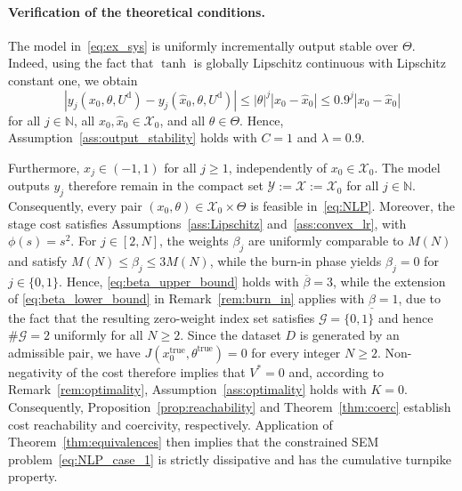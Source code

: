 \documentclass[a4paper,fleqn]{cas-dc}
\begin{document}
\paragraph{Verification of the theoretical conditions.}
The model in~\eqref{eq:ex_sys} is uniformly incrementally output stable over $\Theta$. Indeed, using the fact that $\tanh$ is globally Lipschitz continuous with Lipschitz constant one, we obtain
\begin{equation*}
	|y_j(x_0,\theta,U^{\mathrm d}) - y_j(\hat{x}_0,\theta,U^{\mathrm d})|
	\leq |\theta|^j|x_0-\hat{x}_0| \leq 0.9^j|x_0-\hat{x}_0|
\end{equation*}
for all $j\in\mathbb{N}$, all $x_0,\hat{x}_0\in\mathcal{X}_0$, and all $\theta\in\Theta$.
Hence, Assumption~\ref{ass:output_stability} holds with $C=1$ and $\lambda=0.9$.

Furthermore, $x_j\in(-1,1)$ for all $j\geq1$, independently of $x_0\in\mathcal{X}_0$.
The model outputs $y_j$ therefore remain in the compact set $\mathcal{Y}:=\mathcal{X}:=\mathcal{X}_0$ for all $j\in\mathbb{N}$. Consequently, every pair $(x_0,\theta)\in\mathcal{X}_0\times\Theta$ is feasible in~\eqref{eq:NLP}. Moreover, the stage cost satisfies Assumptions~\ref{ass:Lipschitz} and~\ref{ass:convex_lr}, with $\phi(s)=s^2$.
For $j\in[2,N]$, the weights $\beta_j$ are uniformly comparable to $M(N)$ and satisfy $M(N)\leq\beta_j\leq3M(N)$, while the burn-in phase yields $\beta_j=0$ for $j\in\{0,1\}$. Hence, \eqref{eq:beta_upper_bound} holds with $\overline{\beta}=3$, while the extension of \eqref{eq:beta_lower_bound} in Remark~\ref{rem:burn_in} applies with $\underline{\beta}=1$, due to the fact that the resulting zero-weight index set satisfies $\mathcal{G}=\{0,1\}$ and hence $\#\mathcal{G}=2$ uniformly for all $N\geq2$.
Since the dataset $D$ is generated by an admissible pair, we have $J(x_0^{\mathrm{true}},\theta^{\mathrm{true}}) = 0$ for every integer $N\geq2$. Non-negativity of the cost therefore implies that $V^*=0$ and, according to Remark~\ref{rem:optimality}, Assumption~\ref{ass:optimality} holds with $K=0$.
Consequently, Proposition~\ref{prop:reachability} and Theorem~\ref{thm:coerc} establish cost reachability and coercivity, respectively. Application of Theorem~\ref{thm:equivalences} then implies that the constrained SEM problem~\eqref{eq:NLP_case_1} is strictly dissipative and has the cumulative turnpike property.
\end{document}
